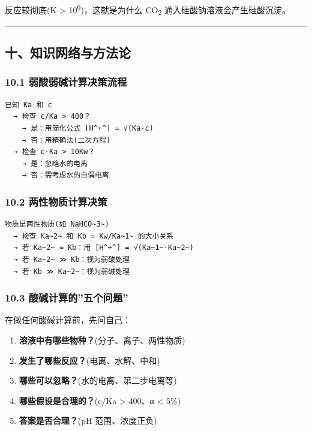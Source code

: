 \documentclass[a4paper,11pt]{ctexart}
\providecommand{\tightlist}{\setlength{\itemsep}{0pt}\setlength{\parskip}{0pt}}
\begin{document}
反应较彻底(K \textgreater{} 10\textsuperscript{6})，这就是为什么 CO\textsubscript{2} 通入硅酸钠溶液会产生硅酸沉淀。

\begin{center}\rule{0.5\linewidth}{0.5pt}\end{center}

\subsection{十、知识网络与方法论}\label{ux5341ux77e5ux8bc6ux7f51ux7edcux4e0eux65b9ux6cd5ux8bba}

\subsubsection{10.1 弱酸弱碱计算决策流程}\label{ux5f31ux9178ux5f31ux78b1ux8ba1ux7b97ux51b3ux7b56ux6d41ux7a0b}

\begin{verbatim}
已知 Ka 和 c
  → 检查 c/Ka > 400？
    → 是：用简化公式 [H^+^] = √(Ka·c)
    → 否：用精确法(二次方程)
  → 检查 c·Ka > 10Kw？
    → 是：忽略水的电离
    → 否：需考虑水的自偶电离
\end{verbatim}

\subsubsection{10.2 两性物质计算决策}\label{ux4e24ux6027ux7269ux8d28ux8ba1ux7b97ux51b3ux7b56}

\begin{verbatim}
物质是两性物质(如 NaHCO~3~)
  → 检查 Ka~2~ 和 Kb = Kw/Ka~1~ 的大小关系
  → 若 Ka~2~ ≈ Kb：用 [H^+^] = √(Ka~1~·Ka~2~)
  → 若 Ka~2~ ≫ Kb：视为弱酸处理
  → 若 Kb ≫ Ka~2~：视为弱碱处理
\end{verbatim}

\subsubsection{10.3 酸碱计算的''五个问题''}\label{ux9178ux78b1ux8ba1ux7b97ux7684ux4e94ux4e2aux95eeux9898}

在做任何酸碱计算前，先问自己：

\begin{enumerate}
\def\labelenumi{\arabic{enumi}.}
\tightlist
\item
  \textbf{溶液中有哪些物种？}(分子、离子、两性物质)
\item
  \textbf{发生了哪些反应？}(电离、水解、中和)
\item
  \textbf{哪些可以忽略？}(水的电离、第二步电离等)
\item
  \textbf{哪些假设是合理的？}(c/Ka \textgreater{} 400、α \textless{} 5\%)
\item
  \textbf{答案是否合理？}(pH 范围、浓度正负)
\end{enumerate}
\end{document}
